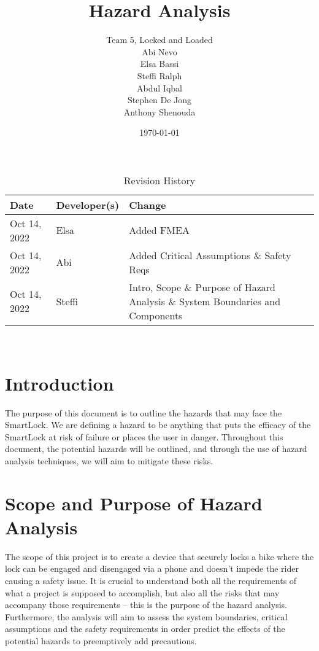 \documentclass{article}
\title{Hazard Analysis\\\progname}
\author{Team 5, Locked and Loaded
		\\ Abi Nevo\\Elsa Bassi\\Steffi Ralph\\Abdul Iqbal\\Stephen De Jong\\Anthony Shenouda
}
\date{\today}
\begin{document}

\begin{table}[hp]
\caption{Revision History} \label{TblRevisionHistory}
\begin{tabularx}{\textwidth}{llX}
\toprule
\textbf{Date} & \textbf{Developer(s)} & \textbf{Change}\\
\midrule
Oct 14, 2022 & Elsa & Added FMEA\\
Oct 14, 2022 & Abi & Added Critical Assumptions \& Safety Reqs\\
Oct 14, 2022 & Steffi & Intro, Scope \& Purpose of Hazard Analysis \& System Boundaries and Components\\
\bottomrule
\end{tabularx}
\end{table}

\newpage

\maketitle

\newpage


\tableofcontents

~\newpage

\section{Introduction}
The purpose of this document is to outline the hazards that may face the SmartLock.  We are defining a hazard to be anything that puts the efficacy of the SmartLock at risk of failure or places the user in danger. 
Throughout this document, the potential hazards will be outlined, and through the use of hazard analysis techniques, we will aim to mitigate these risks. 

\section{Scope and Purpose of Hazard Analysis}

The scope of this project is to create a device that securely locks a bike where the lock can be engaged and disengaged via a phone and doesn’t impede the rider causing a safety issue.  It is crucial to understand both all the requirements of what a project is supposed to accomplish, but also all the risks that may accompany those requirements – this is the purpose of the hazard analysis.  Furthermore, the analysis will aim to assess the system boundaries, critical assumptions and the safety requirements in order predict the effects of the potential hazards to preemptively add precautions. 
\end{document}
